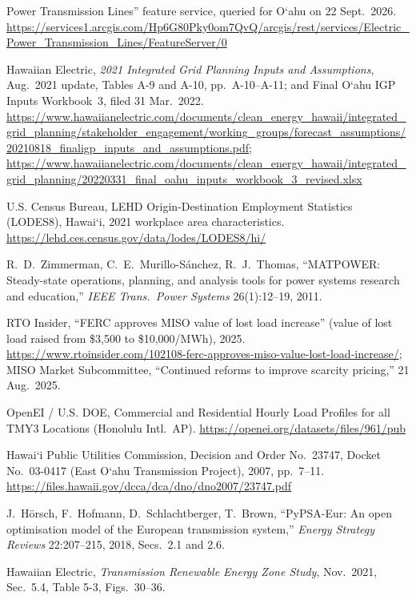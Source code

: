 \documentclass[11pt,a4paper]{article}
\newcommand{\okina}{\textquoteleft}
\newcommand{\Oahu}{O\okina ahu}
\begin{document}
\begin{small}
\begin{description}[leftmargin=4.2em,style=sameline,itemsep=2pt]
  Power Transmission Lines'' feature service, queried for \Oahu{} on 22 Sept.\ 2026.
  \url{https://services1.arcgis.com/Hp6G80Pky0om7QvQ/arcgis/rest/services/Electric_Power_Transmission_Lines/FeatureServer/0}
\item[{[IGP]}] Hawaiian Electric, \emph{2021 Integrated Grid Planning Inputs and
  Assumptions}, Aug.\ 2021 update, Tables A-9 and A-10, pp.~A-10--A-11; and Final
  \Oahu{} IGP Inputs Workbook~3, filed 31 Mar.\ 2022.
  \url{https://www.hawaiianelectric.com/documents/clean_energy_hawaii/integrated_grid_planning/stakeholder_engagement/working_groups/forecast_assumptions/20210818_finaligp_inputs_and_assumptions.pdf};
  \url{https://www.hawaiianelectric.com/documents/clean_energy_hawaii/integrated_grid_planning/20220331_final_oahu_inputs_workbook_3_revised.xlsx}
\item[{[LODES]}] U.S. Census Bureau, LEHD Origin-Destination Employment Statistics
  (LODES8), Hawai\okina i, 2021 workplace area characteristics.
  \url{https://lehd.ces.census.gov/data/lodes/LODES8/hi/}
\item[{[MAT]}] R.~D.~Zimmerman, C.~E.~Murillo-S\'anchez, R.~J.~Thomas, ``MATPOWER:
  Steady-state operations, planning, and analysis tools for power systems research and
  education,'' \emph{IEEE Trans.\ Power Systems} 26(1):12--19, 2011.
\item[{[MISO]}] RTO Insider, ``FERC approves MISO value of lost load increase'' (value
  of lost load raised from \$3{,}500 to \$10{,}000/MWh), 2025.
  \url{https://www.rtoinsider.com/102108-ferc-approves-miso-value-lost-load-increase/};
  MISO Market Subcommittee, ``Continued reforms to improve scarcity pricing,'' 21 Aug.\ 2025.
\item[{[OEI]}] OpenEI / U.S. DOE, Commercial and Residential Hourly Load Profiles for all
  TMY3 Locations (Honolulu Intl.\ AP). \url{https://openei.org/datasets/files/961/pub}
\item[{[PUC]}] Hawai\okina i Public Utilities Commission, Decision and Order No.~23747,
  Docket No.~03-0417 (East \Oahu{} Transmission Project), 2007, pp.~7--11.
  \url{https://files.hawaii.gov/dcca/dca/dno/dno2007/23747.pdf}
\item[{[PYPSA]}] J.~H\"orsch, F.~Hofmann, D.~Schlachtberger, T.~Brown, ``PyPSA-Eur: An
  open optimisation model of the European transmission system,'' \emph{Energy Strategy
  Reviews} 22:207--215, 2018, Secs.~2.1 and 2.6.
\item[{[REZ]}] Hawaiian Electric, \emph{Transmission Renewable Energy Zone Study}, Nov.\
  2021, Sec.~5.4, Table 5-3, Figs.~30--36.

\end{description}
\end{small}
\end{document}
